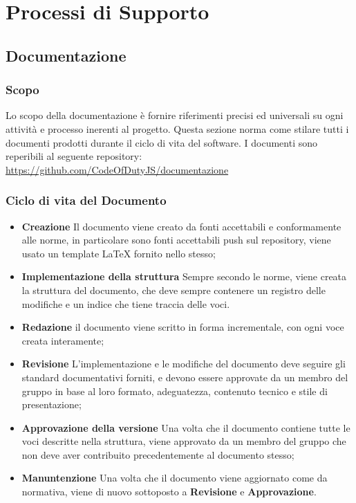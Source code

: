 \section{Processi di Supporto}
	\subsection{Documentazione}
	    
	    \subsubsection{Scopo}
	    Lo scopo della documentazione è fornire riferimenti precisi ed universali su ogni attività e processo inerenti al progetto. Questa sezione norma come stilare tutti i documenti prodotti durante il ciclo di vita del software. I documenti sono reperibili al seguente repository\glo{}:
	    \url{https://github.com/CodeOfDutyJS/documentazione}
	    
	    \subsubsection{Ciclo di vita del Documento}
	    \begin{itemize}
	        \item \textbf{Creazione} Il documento viene creato da fonti accettabili e conformamente alle norme, in particolare sono fonti accettabili push sul repository, viene usato un template LaTeX fornito nello stesso;
	        \item \textbf{Implementazione della struttura} Sempre secondo le norme, viene creata la struttura del documento, che deve sempre contenere un registro delle modifiche e un indice che tiene traccia delle voci.
	        \item \textbf{Redazione} il documento viene scritto in forma incrementale, con ogni voce creata interamente;
	        \item \textbf{Revisione} L'implementazione e le modifiche del documento deve seguire gli standard documentativi forniti, e devono essere approvate da un membro del gruppo in base al loro formato, adeguatezza, contenuto tecnico e stile di presentazione;
	        \item \textbf{Approvazione della versione} Una volta che il documento contiene tutte le voci descritte nella struttura, viene approvato da un membro del gruppo che non deve aver contribuito precedentemente al documento stesso;
	        \item \textbf{Manuntenzione} Una volta che il documento viene aggiornato come da normativa, viene di nuovo sottoposto a \textbf{Revisione} e \textbf{Approvazione}.
	    \end{itemize}
	    
